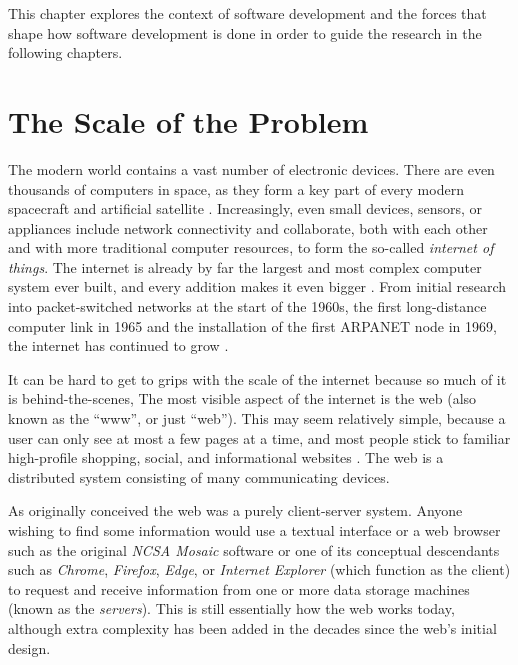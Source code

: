 This chapter explores the context of software development and the forces that shape how software development is done in order to guide the research in the following chapters.

\section{The Scale of the Problem}
\label{section:context scale}

The modern world contains a vast number of electronic devices. There are even thousands of computers in space, as they form a key part of every modern spacecraft and artificial satellite \citep{Eickhoff2011}. Increasingly, even small devices, sensors, or appliances include network connectivity and collaborate, both with each other and with more traditional computer resources, to form the so-called \emph{internet of things}. The internet is already by far the largest and most complex computer system ever built, and every addition makes it even bigger \citep{Belkhir2018}. From initial research into packet-switched networks at the start of the 1960s, the first long-distance computer link in 1965 and the installation of the first ARPANET node in 1969, the internet has continued to grow \citep{Leiner1997}.

\label{A16}
It can be hard to get to grips with the scale of the \gls{internet} because so much of it is behind-the-scenes, The most visible aspect of the internet is the \gls{web} (also known as the \enquote{www}, or just \enquote{web}). This may seem relatively simple, because a user can only see at most a few pages at a time, and most people stick to familiar high-profile shopping, social, and informational websites \citep{Similarweb2023}. The web is a \gls{distributed system} consisting of many communicating devices.


As originally conceived \citep{Berners-Lee1992} the web was a purely \gls{client-server} system. Anyone wishing to find some information would use a textual interface or a \gls{web browser} such as the original \emph{NCSA Mosaic} software \citep{Strawn2014} or one of its conceptual descendants such as \emph{Chrome}, \emph{Firefox}, \emph{Edge}, or \emph{Internet Explorer} (which function as the \gls{client}) to request and receive information from one or more data storage machines (known as the \emph{servers}). This is still essentially how the web works today, although extra complexity has been added in the decades since the web's initial design.

